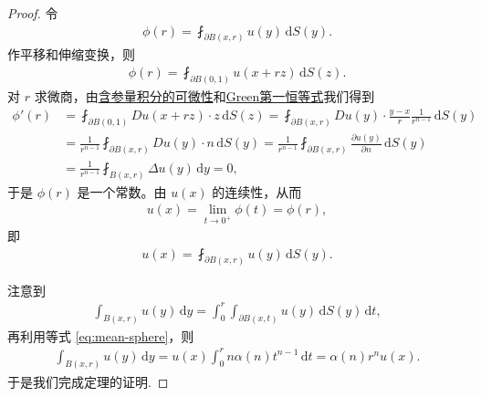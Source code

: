 \documentclass[../../main.tex]{subfiles}%
\begin{document}
\begin{proof}
令
\begin{align*}
\phi(r) = \fint_{\partial B(x,r)} u(y)\,\mathrm{d}S(y).
\end{align*}
作平移和伸缩变换，则
\begin{align*}
\phi(r) = \fint_{\partial B(0,1)} u(x+rz)\,\mathrm{d}S(z).
\end{align*}
对 $r$ 求微商，由\hyperref[Basis of Analytics-theorem:含参量积分的可微性1]{含参量积分的可微性}和\hyperref[Basis of Analytics-theorem:Green第一恒等式]{Green第一恒等式}我们得到
\begin{align*}
\phi'(r) &= \fint_{\partial B(0,1)} D u(x+rz)\cdot z\,\mathrm{d}S(z)
= \fint_{\partial B(x,r)} D u(y)\cdot \frac{y-x}{r}\frac{1}{r^{n-1}}\,\mathrm{d}S(y) \\
&= \frac{1}{r^{n-1}}\fint_{\partial B(x,r)} D u(y)\cdot n\,\mathrm{d}S(y) = \frac{1}{r^{n-1}}\fint_{\partial B(x,r)} \frac{\partial u(y)}{\partial n}\,\mathrm{d}S(y) \\
&= \frac{1}{r^{n-1}}\fint_{B(x,r)} \Delta u(y)\,\mathrm{d}y = 0,
\end{align*}
于是 $\phi(r)$ 是一个常数。由 $u(x)$ 的连续性，从而
\begin{align*}
u(x) = \lim_{t\to 0^+} \phi(t) = \phi(r),
\end{align*}
即
\begin{align}
u(x) = \fint_{\partial B(x,r)} u(y)\,\mathrm{d}S(y). \label{eq:mean-sphere}
\end{align}

注意到
\begin{align*}
\int_{B(x,r)} u(y)\,\mathrm{d}y = \int_0^r \int_{\partial B(x,t)} u(y)\,\mathrm{d}S(y)\,\mathrm{d}t,
\end{align*}
再利用等式 \eqref{eq:mean-sphere}，则
\begin{align*}
\int_{B(x,r)} u(y)\,\mathrm{d}y = u(x)\int_0^r n\alpha(n)t^{n-1}\,\mathrm{d}t = \alpha(n)r^n u(x).
\end{align*}
于是我们完成定理的证明.
\end{proof}
\end{document}
